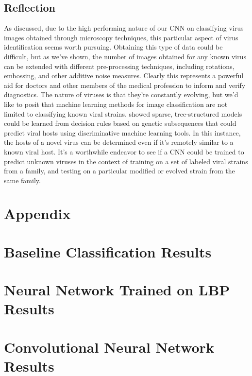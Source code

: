 \begin{multicols}{2}
\section{Reflection}
As discussed, due to the high performing nature of our CNN on classifying virus images obtained through microscopy techniques, this particular aspect of virus identification seems worth pursuing. Obtaining this type of data could be difficult, but as we've shown, the number of images obtained for any known virus can be extended with different pre-processing techniques, including rotations, embossing, and other additive noise measures. Clearly this represents a powerful aid for doctors and other members of the medical profession to inform and verify diagnostics. 
The nature of viruses is that they're constantly evolving, but we'd like to posit that machine learning methods for image classification are not limited to classifying known viral strains. \citet{work_A} showed sparse, tree-structured models could be learned from decision rules based on genetic subsequences that could predict viral hosts using discriminative machine learning tools. In this instance, the hosts of a novel virus can be determined even if it's remotely similar to a known viral host. It's a worthwhile endeavor to see if a CNN could be trained to predict unknown viruses in the context of training on a set of labeled viral strains from a family, and testing on a particular modified or evolved strain from the same family. 

\end{multicols}

\newpage
\section*{Appendix}
\appendix
\section{Baseline Classification Results}


\newpage
\section{Neural Network Trained on LBP Results} \label{appendix:images}




\newpage
\section{Convolutional Neural Network Results}



